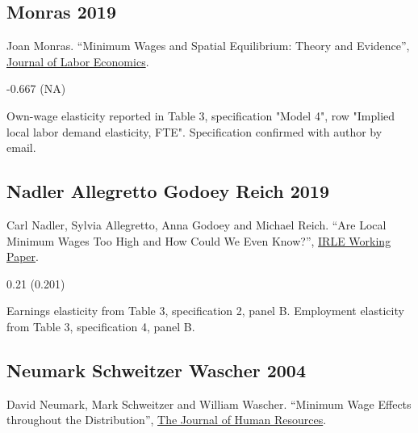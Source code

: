 \subsection*{Monras 2019}
\vspace{-0.7em}

\noindent Joan Monras. ``Minimum Wages and Spatial Equilibrium: Theory and Evidence'', \href{https://doi.org/10.1086/702650}{Journal of Labor Economics}.

\vspace{0.7em}

 -0.667 (NA)

\vspace{0.7em}

 Own-wage elasticity reported in Table 3, specification "Model 4", row "Implied local labor demand elasticity, FTE". Specification confirmed with author by email.

\subsection*{Nadler Allegretto Godoey Reich 2019}
\vspace{-0.7em}

\noindent Carl Nadler, Sylvia Allegretto, Anna Godoey and Michael Reich. ``Are Local Minimum Wages Too High and How Could We Even Know?'', \href{http://irle.berkeley.edu/files/2019/04/Are-Local-Minimum-Wages-Too-High.pdf}{IRLE Working Paper}.

\vspace{0.7em}

 0.21 (0.201)

\vspace{0.7em}

 Earnings elasticity from Table 3, specification 2, panel B. Employment elasticity from Table 3, specification 4, panel B.

\subsection*{Neumark Schweitzer Wascher 2004}
\vspace{-0.7em}

\noindent David Neumark, Mark Schweitzer and William Wascher. ``Minimum Wage Effects throughout the Distribution'', \href{https://doi.org/10.3368/jhr.XXXIX.2.425}{The Journal of Human Resources}.

